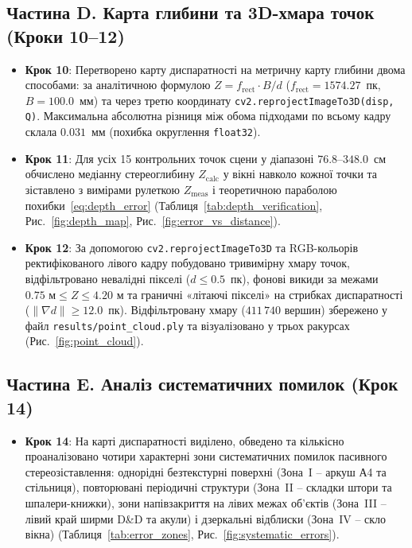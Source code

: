 \documentclass[14pt, a4paper]{extarticle}
\begin{document}
\subsection{Частина D. Карта глибини та 3D-хмара точок (Кроки 10--12)}
\begin{itemize}
    \item \textbf{Крок 10}: Перетворено карту диспаратності на метричну карту глибини двома способами: за аналітичною формулою $Z = f_{\text{rect}} \cdot B / d$ ($f_{\text{rect}} = 1574.27$~пк, $B = 100.0$~мм) та через третю координату \texttt{cv2.reprojectImageTo3D(disp, Q)}. Максимальна абсолютна різниця між обома підходами по всьому кадру склала $0.031$~мм (похибка округлення \texttt{float32}).
    \item \textbf{Крок 11}: Для усіх 15 контрольних точок сцени у діапазоні $76.8$--$348.0$~см обчислено медіанну стереоглибину $Z_{\text{calc}}$ у вікні навколо кожної точки та зіставлено з вимірами рулеткою $Z_{\text{meas}}$ і теоретичною параболою похибки~\eqref{eq:depth_error} (Таблиця~\ref{tab:depth_verification}, Рис.~\ref{fig:depth_map}, Рис.~\ref{fig:error_vs_distance}).
    \item \textbf{Крок 12}: За допомогою \texttt{cv2.reprojectImageTo3D} та RGB-кольорів ректифікованого лівого кадру побудовано тривимірну хмару точок, відфільтровано невалідні пікселі ($d \le 0.5$~пк), фонові викиди за межами $0.75\text{ м} \le Z \le 4.20\text{ м}$ та граничні «літаючі пікселі» на стрибках диспаратності ($\|\nabla d\| \ge 12.0$~пк). Відфільтровану хмару ($411\,740$ вершин) збережено у файл \texttt{results/point\_cloud.ply} та візуалізовано у трьох ракурсах (Рис.~\ref{fig:point_cloud}).
\end{itemize}

\subsection{Частина E. Аналіз систематичних помилок (Крок 14)}
\begin{itemize}
    \item \textbf{Крок 14}: На карті диспаратності виділено, обведено та кількісно проаналізовано чотири характерні зони систематичних помилок пасивного стереозіставлення: однорідні безтекстурні поверхні (Зона~I -- аркуш А4 та стільниця), повторювані періодичні структури (Зона~II -- складки штори та шпалери-книжки), зони напівзакриття на лівих межах об'єктів (Зона~III -- лівий край ширми D\&D та акули) і дзеркальні відблиски (Зона~IV -- скло вікна) (Таблиця~\ref{tab:error_zones}, Рис.~\ref{fig:systematic_errors}).
\end{itemize}
\end{document}
